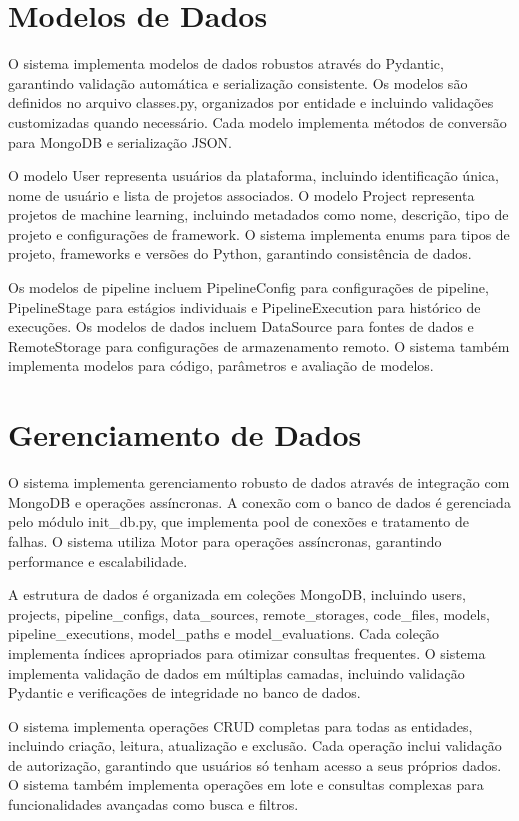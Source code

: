 \documentclass[12pt,a4paper]{article}
\begin{document}
\section{Modelos de Dados}

O sistema implementa modelos de dados robustos através do Pydantic, garantindo validação automática e serialização consistente. Os modelos são definidos no arquivo classes.py, organizados por entidade e incluindo validações customizadas quando necessário. Cada modelo implementa métodos de conversão para MongoDB e serialização JSON.

O modelo User representa usuários da plataforma, incluindo identificação única, nome de usuário e lista de projetos associados. O modelo Project representa projetos de machine learning, incluindo metadados como nome, descrição, tipo de projeto e configurações de framework. O sistema implementa enums para tipos de projeto, frameworks e versões do Python, garantindo consistência de dados.

Os modelos de pipeline incluem PipelineConfig para configurações de pipeline, PipelineStage para estágios individuais e PipelineExecution para histórico de execuções. Os modelos de dados incluem DataSource para fontes de dados e RemoteStorage para configurações de armazenamento remoto. O sistema também implementa modelos para código, parâmetros e avaliação de modelos.

\section{Gerenciamento de Dados}

O sistema implementa gerenciamento robusto de dados através de integração com MongoDB e operações assíncronas. A conexão com o banco de dados é gerenciada pelo módulo init_db.py, que implementa pool de conexões e tratamento de falhas. O sistema utiliza Motor para operações assíncronas, garantindo performance e escalabilidade.

A estrutura de dados é organizada em coleções MongoDB, incluindo users, projects, pipeline_configs, data_sources, remote_storages, code_files, models, pipeline_executions, model_paths e model_evaluations. Cada coleção implementa índices apropriados para otimizar consultas frequentes. O sistema implementa validação de dados em múltiplas camadas, incluindo validação Pydantic e verificações de integridade no banco de dados.

O sistema implementa operações CRUD completas para todas as entidades, incluindo criação, leitura, atualização e exclusão. Cada operação inclui validação de autorização, garantindo que usuários só tenham acesso a seus próprios dados. O sistema também implementa operações em lote e consultas complexas para funcionalidades avançadas como busca e filtros.
\end{document}
